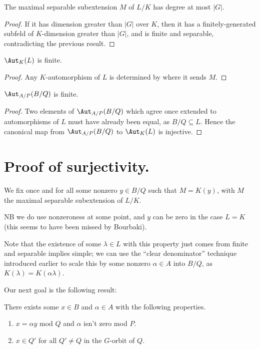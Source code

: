 \begin{corollary}
  \label{Bourbaki52222.separableClosure_finrank_le}
  The maximal separable subextension $M$ of $L/K$ has degree at most $|G|$.
  \leanok
\end{corollary}
\begin{proof}
  If it has dimension greater than $|G|$ over $K$, then it has a finitely-generated
  subfeld of $K$-dimension greater than $|G|$, and is finite and separable, contradicting
  the previous result.
\end{proof}

\begin{corollary} $\Aut_K(L)$ is finite.
\end{corollary}
\begin{proof} Any $K$-automorphism of $L$ is determined by where it sends $M$.
\end{proof}

\begin{corollary} $\Aut_{A/P}(B/Q)$ is finite.
\end{corollary}
\begin{proof}
  Two elements of $\Aut_{A/P}(B/Q)$ which agree once extended to automorphisms of $L$
  must have already been equal, as $B/Q\subseteq L$. Hence the canonical map
  from $\Aut_{A/P}(B/Q)$ to $\Aut_K(L)$ is injective.
\end{proof}

\section{Proof of surjectivity.}

\begin{definition} We fix once and for all some nonzero $y\in B/Q$ such that $M=K(y)$,
  with $M$ the maximal separable subextension of $L/K$.
\end{definition}

NB we do use nonzeroness at some point, and $y$ can be zero in the case $L=K$
(this seems to have been missed by Bourbaki).

Note that the existence of some $\lambda\in L$ with this property just comes from finite
and separable implies simple; we can use the ``clear denominator'' technique introduced
earlier to scale this by some nonzero $\alpha\in A$ into $B/Q$, as
$K(\lambda)=K(\alpha\lambda)$.

Our next goal is the following result:
\begin{theorem} There exists some $x\in B$ and $\alpha\in A$ with the following
  properties.
  \begin{enumerate}
  \item $x=\alpha y$ mod $Q$ and $\alpha$ isn't zero mod $P$.
  \item $x\in Q'$ for all $Q'\not=Q$ in the $G$-orbit of $Q$.
  \end{enumerate}
\end{theorem}

